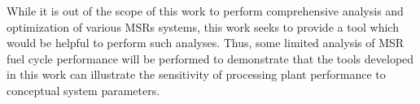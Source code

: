 While it is out of the scope of this work to perform
comprehensive analysis and optimization of various \glspl{MSR} 
systems, this 
work seeks to provide a tool which would be helpful to perform such 
analyses. Thus, some limited analysis of \gls{MSR} fuel cycle 
performance will be performed to demonstrate that the tools developed 
in this work can illustrate the sensitivity of processing plant 
performance to conceptual system parameters.